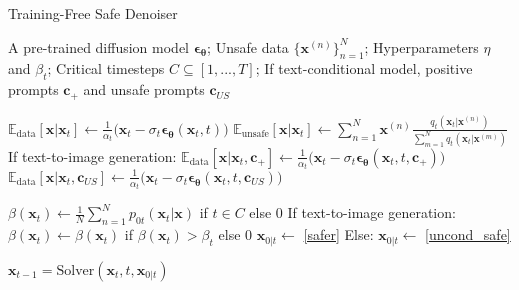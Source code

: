 \begin{algorithm}[!tb]
  \caption{Training-Free Safe Denoiser}
  \label{algo:safer}
  \begin{algorithmic}
    A pre-trained diffusion model $\bm{\epsilon}_{\bm{\theta}}$; Unsafe data $\{\mathbf{x}^{(n)}\}_{n=1}^{N}$; Hyperparameters $\eta$ and $\beta_{t}$; Critical timesteps $C\subseteq[1,...,T]$; If text-conditional model, positive prompts $\mathbf{c}_{+}$ and unsafe prompts $\mathbf{c}_{US}$
    \vspace{.1cm} 
    
    \STATE $\mathbb{E}_{\text{data}}[\mathbf{x}\vert\mathbf{x}_{t}]\leftarrow \frac{1}{\alpha_{t}}\big(\mathbf{x}_{t}-\sigma_{t}\bm{\epsilon}_{\bm{\theta}}(\mathbf{x}_{t},t)\big)$
        \STATE $\mathbb{E}_{\text{unsafe}}[\mathbf{x}\vert\mathbf{x}_{t}]\leftarrow \sum_{n=1}^{N}\mathbf{x}^{(n)}\frac{q_{t}(\mathbf{x}_{t}\vert\mathbf{x}^{(n)})}{\sum_{m=1}^{N}q_{t}(\mathbf{x}_{t}\vert\mathbf{x}^{(m)})}$
    \STATE If text-to-image generation:
    \STATE \quad \quad $\mathbb{E}_{\text{data}}[\mathbf{x}\vert\mathbf{x}_{t},\mathbf{c}_{+}]\leftarrow \frac{1}{\alpha_{t}}\big(\mathbf{x}_{t}-\sigma_{t}\bm{\epsilon}_{\bm{\theta}}(\mathbf{x}_{t},t,\mathbf{c}_{+})\big)$
    \STATE \quad \quad $\mathbb{E}_{\text{data}}[\mathbf{x}\vert\mathbf{x}_{t},\mathbf{c}_{US}]\leftarrow \frac{1}{\alpha_{t}}\big(\mathbf{x}_{t}-\sigma_{t}\bm{\epsilon}_{\bm{\theta}}(\mathbf{x}_{t},t,\mathbf{c}_{US})\big)$

    \STATE $\beta(\mathbf{x}_{t})\leftarrow\frac{1}{N}\sum_{n=1}^{N} p_{0t}(\mathbf{x}_{t}\vert\mathbf{x})$ if $t\in C$ else 0
    \STATE If text-to-image generation:
    \STATE \quad \quad  $\beta(\mathbf{x}_{t})\leftarrow\beta(\mathbf{x}_{t})$ if $\beta(\mathbf{x}_{t})>\beta_{t}$ else 0
    \STATE \quad \quad $\mathbf{x}_{0\vert t}\leftarrow$ \eqref{safer}
    \STATE Else:
        \STATE \quad \quad $\mathbf{x}_{0\vert t}\leftarrow$ \eqref{uncond_safe}
    
    \STATE $\mathbf{x}_{t-1}=\text{Solver}(\mathbf{x}_{t},t,\mathbf{x}_{0\vert t})$
    \ENDFOR 
  \end{algorithmic}
\end{algorithm}